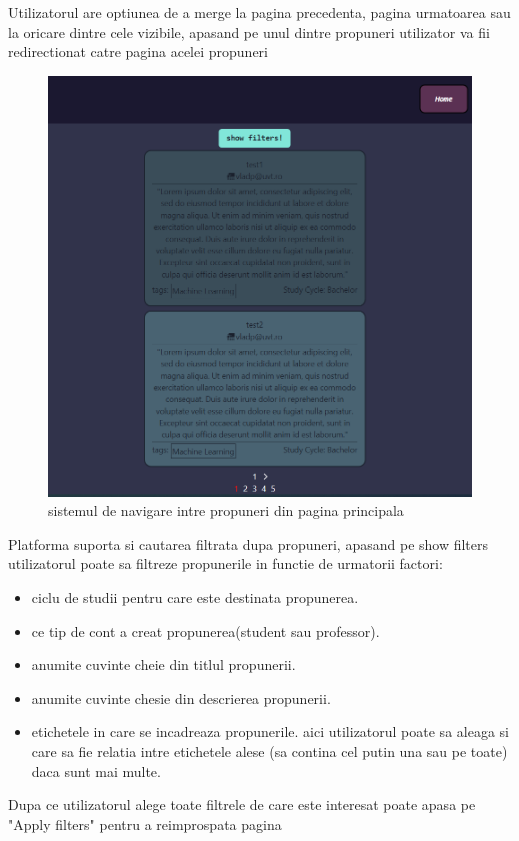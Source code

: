 \documentclass[12pt,a4paper,hidelinks]{report}
\theoremstyle{definition}
\theoremstyle{remark}
\begin{document}
Utilizatorul are optiunea de a merge la pagina precedenta, pagina urmatoarea sau la oricare dintre cele vizibile, apasand 
pe unul dintre propuneri utilizator va fii redirectionat catre pagina acelei propuneri
\begin{figure}[H]
    \centering
    \includegraphics[scale=0.5]{images/HomePage.PNG}
    \caption{sistemul de navigare intre propuneri din pagina principala}
\end{figure}
Platforma suporta si cautarea filtrata dupa propuneri, apasand pe show filters utilizatorul poate sa filtreze propunerile 
in functie de urmatorii factori:
\begin{itemize}
    \item ciclu de studii pentru care este destinata propunerea.
    \item ce tip de cont a creat propunerea(student sau professor).
    \item anumite cuvinte cheie din titlul propunerii.
    \item anumite cuvinte chesie din descrierea propunerii.
    \item etichetele in care se incadreaza propunerile.
    aici utilizatorul poate sa aleaga si care sa fie relatia intre etichetele alese (sa contina cel putin una sau pe toate)
    daca sunt mai multe.
\end{itemize}
    Dupa ce utilizatorul alege toate filtrele de care este interesat poate apasa pe "Apply filters" pentru a reimprospata pagina
\end{document}

